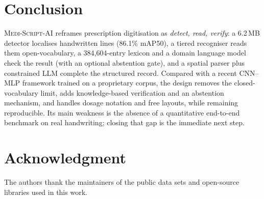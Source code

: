 \documentclass[journal]{IEEEtran}
\newcommand{\sys}{\textsc{Medi-Script-AI}}
\begin{document}
\section{Conclusion}\label{sec:conclusion}
\sys{} reframes prescription digitisation as \emph{detect, read, verify}: a 6.2\,MB detector localises handwritten lines (86.1\% mAP50), a tiered recogniser reads them open-vocabulary, a 384{,}604-entry lexicon and a domain language model check the result (with an optional abstention gate), and a spatial parser plus constrained LLM complete the structured record. Compared with a recent CNN--MLP framework trained on a proprietary corpus, the design removes the closed-vocabulary limit, adds knowledge-based verification and an abstention mechanism, and handles dosage notation and free layouts, while remaining reproducible. Its main weakness is the absence of a quantitative end-to-end benchmark on real handwriting; closing that gap is the immediate next step.

\section*{Acknowledgment}
The authors thank the maintainers of the public data sets and open-source libraries used in this work.



\end{document}
